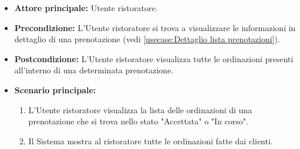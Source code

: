 \label{usecase:Visualizzazione lista ordinazioni}
\begin{itemize}
	\item \textbf{Attore principale:} Utente ristoratore.

	\item \textbf{Precondizione:} L'Utente ristoratore si trova a visualizzare le informazioni in dettaglio di una prenotazione (vedi \autoref{usecase:Dettaglio lista prenotazioni}).

	\item \textbf{Postcondizione:} L'Utente ristoratore visualizza tutte le ordinazioni presenti all'interno di una determinata prenotazione.

	\item \textbf{Scenario principale:}
	      \begin{enumerate}
		      \item L'Utente ristoratore visualizza la lista delle ordinazioni di una prenotazione che si trova nello stato "Accettata" o "In corso".
		      \item Il Sistema mostra al ristoratore tutte le ordinazioni fatte dai clienti.
	      \end{enumerate}
\end{itemize}


